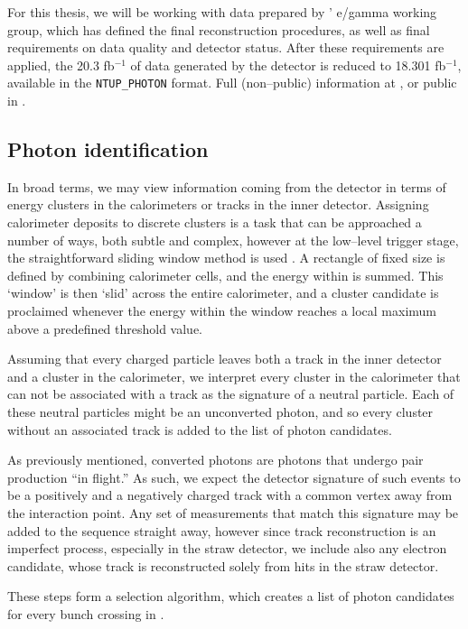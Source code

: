 For this thesis, we will be working with data prepared by \atlas{}' e/gamma working group, which has defined the final reconstruction procedures, as well as final requirements on data quality and detector status. After these requirements are applied, the 20.3 fb$^{-1}$ of data generated by the \atlas{} detector is reduced to 18.301 fb$^{-1}$, available in the \texttt{NTUP\_PHOTON} format. Full (non--public) information at \cite{egtwiki}, or public in \cite{phorec}.


\subsection{Photon identification}
In broad terms, we may view information coming from the detector in terms of energy clusters in the calorimeters or tracks in the inner detector. Assigning calorimeter deposits to discrete clusters is a task that can be approached a number of ways, both subtle and complex, however at the low--level trigger stage, the straightforward sliding window method is used \cite{atlascluster:sw}. A rectangle of fixed size is defined by combining calorimeter cells, and the energy within is summed. This `window' is then `slid' across the entire calorimeter, and a cluster candidate is proclaimed whenever the energy within the window reaches a local maximum above a predefined threshold value.

Assuming that every charged particle leaves both a track in the inner detector and a cluster in the calorimeter, we interpret every cluster in the calorimeter that can not be associated with a track as the signature of a neutral particle. Each of these neutral particles might be an unconverted photon, and so every cluster without an associated track is added to the list of photon candidates.

As previously mentioned, converted photons are photons that undergo pair production ``in flight.'' As such, we expect the detector signature of such events to be a positively and a negatively charged track with a common vertex away from the interaction point. Any set of measurements that match this signature may be added to the sequence straight away, however since track reconstruction is an imperfect process, especially in the straw detector, we include also any electron candidate, whose track is reconstructed solely from hits in the straw detector.

These steps form a selection algorithm, which creates a list of photon candidates for every bunch crossing in \atlas{} \cite{phorec}.

